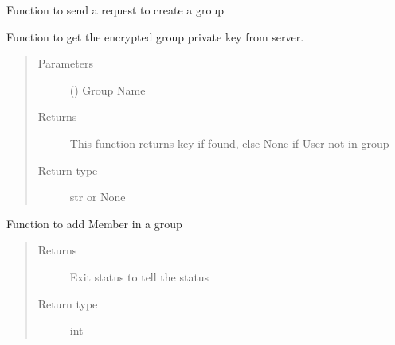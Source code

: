 \documentclass[letterpaper,10pt,english]{sphinxmanual}
\begin{document}
\begin{fulllineitems}
\begin{fulllineitems}
\label{\detokenize{Message:Message.Message._create_grp}}
Function to send a request to create a group

\end{fulllineitems}


\begin{fulllineitems}
\label{\detokenize{Message:Message.Message._get_group_key}}
Function to get the encrypted group private key from server.
\begin{quote}\begin{description}
\item[{Parameters}] \leavevmode
{} () \textendash{} Group Name

\item[{Returns}] \leavevmode
This function returns key if found, else None if User not in group

\item[{Return type}] \leavevmode
str or None

\end{description}\end{quote}

\end{fulllineitems}


\begin{fulllineitems}
\label{\detokenize{Message:Message.Message._add_member_in_group}}
Function to add Member in a group
\begin{quote}\begin{description}
\item[{Returns}] \leavevmode
Exit status to tell the status

\item[{Return type}] \leavevmode
int

\end{description}\end{quote}


\end{fulllineitems}
\end{fulllineitems}
\end{document}
